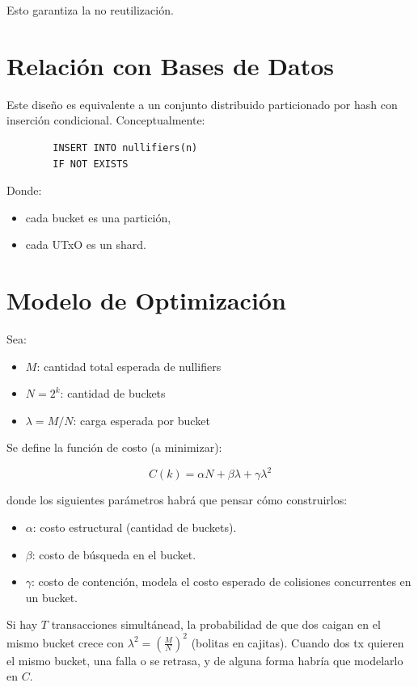 \documentclass[11pt]{article}
\begin{document}
	Esto garantiza la no reutilización.
	
	\section{Relación con Bases de Datos}
	
	Este diseño es equivalente a un conjunto distribuido particionado por hash con inserción condicional. Conceptualmente:
	
	\begin{verbatim}
		INSERT INTO nullifiers(n)
		IF NOT EXISTS
	\end{verbatim}
	
	Donde:
	
	\begin{itemize}
		\item cada bucket es una partición,
		\item cada UTxO es un shard.
	\end{itemize}
	
	\section{Modelo de Optimización}
	
	Sea:
	
	\begin{itemize}
		\item $M$: cantidad total esperada de nullifiers
		\item $N = 2^k$: cantidad de buckets
		\item $\lambda = M/N$: carga esperada por bucket
	\end{itemize}
	
	Se define la función de costo (a minimizar):
	
	$$C(k) = \alpha N + \beta \lambda + \gamma \lambda^2$$
	
	donde los siguientes parámetros habrá que pensar cómo construirlos:
	
	\begin{itemize}
		\item $\alpha$: costo estructural (cantidad de buckets).
		\item $\beta$: costo de búsqueda en el bucket.
		\item $\gamma$: costo de contención, modela el costo esperado de colisiones concurrentes en un bucket.
	\end{itemize}
	
	Si hay $T$ transacciones simultánead, la probabilidad de que dos caigan en el mismo bucket crece con $\lambda^2 = \left(\frac{M}{N}\right)^2$ (bolitas en cajitas). Cuando dos tx quieren el mismo bucket, una falla o se retrasa, y de alguna forma habría que modelarlo en $C$.
	
\end{document}
